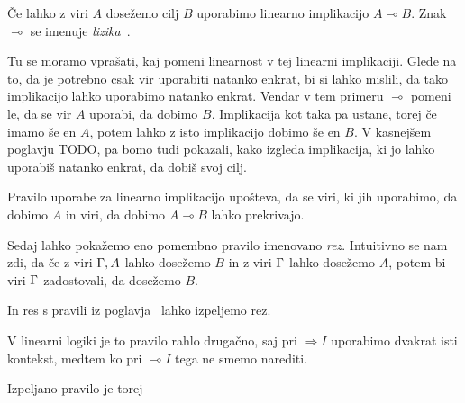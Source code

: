 \cite[poglavje 1.2]{barber1997linear}
Če lahko z viri \(A\) dosežemo cilj \(B\) uporabimo linearno implikacijo \(A \multimap B\). Znak \(\multimap\) se imenuje \emph{lizika}~\cite[L20.3]{truthIsEphemeral}.
%
\begin{prooftree}
\end{prooftree}
%
Tu se moramo vprašati, kaj pomeni linearnost v tej linearni implikaciji. Glede na to, da je potrebno csak vir uporabiti natanko enkrat, bi si lahko mislili, da tako implikacijo lahko uporabimo natanko enkrat. Vendar v tem primeru \(\multimap\) pomeni le, da se vir \(A\) uporabi, da dobimo \(B\). Implikacija kot taka pa ustane, torej če imamo še en \(A\), potem lahko z isto implikacijo dobimo še en \(B\).
V kasnejšem poglavju TODO, pa bomo tudi pokazali, kako izgleda implikacija, ki jo lahko uporabiš natanko enkrat, da dobiš svoj cilj.
%
\begin{prooftree}
\end{prooftree}
%
Pravilo uporabe za linearno implikacijo upošteva, da se viri, ki jih uporabimo, da dobimo \(A\) in viri, da dobimo \(A \multimap B\) lahko prekrivajo.

Sedaj lahko pokažemo eno pomembno pravilo imenovano \emph{rez}. Intuitivno se nam zdi, da če z viri \(\Gamma, A\) lahko dosežemo \(B\)  in z viri \(\Gamma\) lahko dosežemo \(A\), potem bi viri \(\Gamma\) zadostovali, da dosežemo \(B\).
%
\begin{prooftree}
\end{prooftree}
%
In res s pravili iz poglavja~ lahko izpeljemo rez.
%
\begin{prooftree}
\end{prooftree}
%
V linearni logiki je to pravilo rahlo drugačno, saj pri \(\Rightarrow I\) uporabimo dvakrat isti kontekst, medtem ko pri \(\multimap I\) tega ne smemo narediti.
%
\begin{prooftree}
\end{prooftree}
%
Izpeljano pravilo je torej
%
\begin{prooftree}
\end{prooftree}

